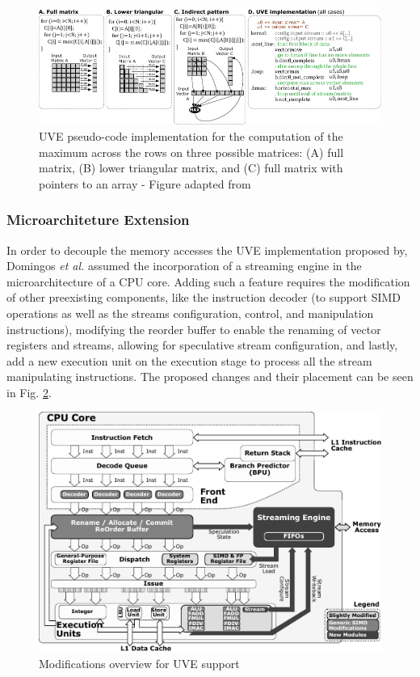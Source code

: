 \begin{figure}[H]
	\begin{center}
 		\includegraphics[width=.9\linewidth]{images/UVE-pseudo-code.pdf}
 		\caption{UVE pseudo-code implementation for the computation of the maximum
across the rows on three possible matrices: (A) full matrix, (B) lower triangular
matrix, and (C) full matrix with pointers to an array - Figure adapted from \cite{uve-paper}}
 		\label{fig:uve-mem-access}
	\end{center} 
\end{figure}


\subsubsection{Microarchiteture Extension}

In order to decouple the memory accesses the \acrshort{UVE} implementation proposed by, Domingos \textit{et al.} \cite{uve-paper} assumed the incorporation of a streaming engine in the microarchitecture of a CPU core. Adding such a feature requires the modification of other preexisting components, like the instruction decoder (to support SIMD operations as well as the streams configuration, control, and manipulation instructions), modifying the reorder buffer to enable the renaming of vector registers and streams, allowing for speculative stream configuration, and lastly, add a new execution unit on the execution stage to process all the stream manipulating instructions. The proposed changes and their placement can be seen in Fig. \ref{fig:uve-arch}.

\begin{figure}[H]
	\begin{center}
 		\includegraphics[width=0.67\linewidth]{images/UVE-arch.pdf}
 		\caption{Modifications overview for UVE support}
 		\label{fig:uve-arch}
	\end{center} 
\end{figure}

